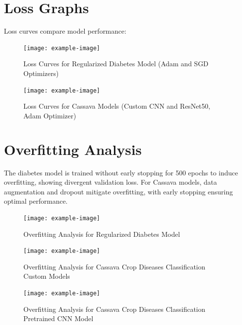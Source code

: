 \documentclass[a4paper,12pt]{article}
\begin{document}
\section*{Loss Graphs}
Loss curves compare model performance:

\begin{figure}[H]
    \centering
    \texttt{[image: example-image]}
    \caption{Loss Curves for Regularized Diabetes Model (Adam and SGD Optimizers)}
\end{figure}

\begin{figure}[H]
    \centering
    \texttt{[image: example-image]}
    \caption{Loss Curves for Cassava Models (Custom CNN and ResNet50, Adam Optimizer)}
\end{figure}

\section*{Overfitting Analysis}
The diabetes model is trained without early stopping for 500 epochs to induce overfitting, showing divergent validation loss. For Cassava models, data augmentation and dropout mitigate overfitting, with early stopping ensuring optimal performance.

\begin{figure}[H]
    \centering
    \texttt{[image: example-image]}
    \caption{Overfitting Analysis for Regularized Diabetes Model}
\end{figure}

\begin{figure}[H]
    \centering
    \texttt{[image: example-image]}
    \caption{Overfitting Analysis for Cassava Crop Diseases Classification Custom Models}
\end{figure}

\begin{figure}[H]
    \centering
    \texttt{[image: example-image]}
    \caption{Overfitting Analysis for Cassava Crop Diseases Classification Pretrained CNN Model}
\end{figure}

\end{document}
